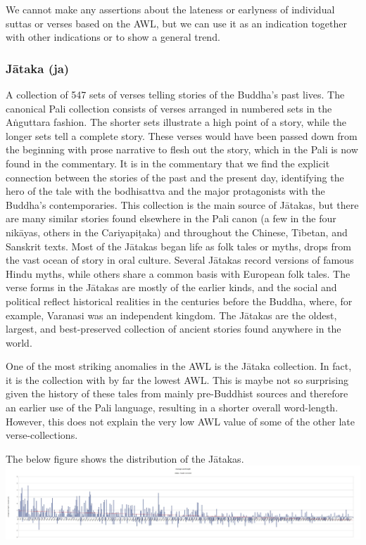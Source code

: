 We cannot make any assertions about the lateness or earlyness of individual suttas or verses based on the AWL, but we can use it as an indication together with other indications or to show a general trend.

\subsubsection{Jātaka (ja)}
A collection of 547 sets of verses telling stories of the Buddha’s past lives. The canonical Pali collection consists of verses arranged in numbered sets in the Aṅguttara fashion. The shorter sets illustrate a high point of a story, while the longer sets tell a complete story. These verses would have been passed down from the beginning with prose narrative to flesh out the story, which in the Pali is now found in the commentary. It is in the commentary that we find the explicit connection between the stories of the past and the present day, identifying the hero of the tale with the bodhisattva and the major protagonists with the Buddha’s contemporaries. This collection is the main source of Jātakas, but there are many similar stories found elsewhere in the Pali canon (a few in the four nikāyas, others in the Cariyapiṭaka) and throughout the Chinese, Tibetan, and Sanskrit texts. Most of the Jātakas began life as folk tales or myths, drops from the vast ocean of story in oral culture. Several Jātakas record versions of famous Hindu myths, while others share a common basis with European folk tales. The verse forms in the Jātakas are mostly of the earlier kinds, and the social and political reflect historical realities in the centuries before the Buddha, where, for example, Varanasi was an independent kingdom. The Jātakas are the oldest, largest, and best-preserved collection of ancient stories found anywhere in the world. 

One of the most striking anomalies in the AWL is the Jātaka collection. In fact, it is the collection with by far the lowest AWL. This is maybe not so surprising given the history of these tales from mainly pre-Buddhist sources and therefore an earlier use of the Pali language, resulting in a shorter overall word-length. However, this does not explain the very low AWL value of some of the other late verse-collections.

The below figure shows the distribution of the Jātakas.\\

\includegraphics[width=\linewidth]{jataka.jpg}
\label{jataka}

